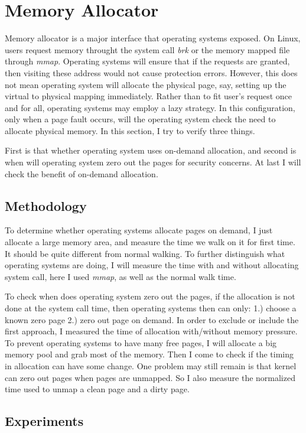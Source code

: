 \section{Memory Allocator}
	\label{sec:alloc}
Memory allocator is a major interface that operating systems exposed. On Linux, users request memory throught the system call \emph{brk} or
the memory mapped file through \emph{mmap}. Operating systems will ensure
that if the requests are granted, then visiting these address would not cause
protection errors. However, this does not mean operating system will allocate
the physical page, say, setting up the virtual to physical mapping
immediately.  Rather than to fit user's request once and for all, operating
systems may employ a lazy strategy. In this configuration, only when
a page fault occurs, will the operating system check the need to allocate
physical memory. In this section, I try to verify three things.

First is that whether operating system uses on-demand allocation, and second
is when will operating system zero out the pages for security concerns. At last
I will check the benefit of on-demand allocation.

\subsection{Methodology}
To determine whether operating systems allocate pages on demand, I just
allocate a large memory area, and measure the time we walk on it for first
time. It should be quite different from normal walking. To further distinguish
what operating systems are doing, I will measure the time with and without
allocating system call, here I used \emph{mmap}, as well as the normal walk
time.

To check when does operating system zero out the pages, if the allocation is
not done at the system call time, then operating systems then can only: 1.)
choose a known zero page 2.) zero out page on demand. In order to exclude or
include the first approach, I measured the time of allocation with/without
memory pressure. To prevent operating systems to have many free pages, I will
allocate a big memory pool and grab most of the memory. Then I come to check if
the timing in allocation can have some change.  One problem may still remain is
that kernel can zero out pages when pages are unmapped. So I also measure the
normalized time used to unmap a clean page and a dirty page.

\subsection{Experiments}
